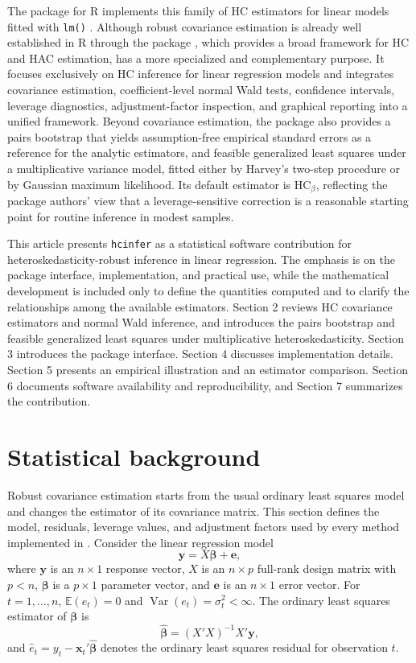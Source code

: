 The  package for R implements this family of HC estimators for linear models fitted with \texttt{lm()} \citep{RCoreTeam2026, MarinhoHcinfer2026}. Although robust covariance estimation is already well established in R through the  package \citep{Zeileis2004, Zeileis2006}, which provides a broad framework for HC and HAC estimation,  has a more specialized and complementary purpose. It focuses exclusively on HC inference for linear regression models and integrates covariance estimation, coefficient-level normal Wald tests, confidence intervals, leverage diagnostics, adjustment-factor inspection, and graphical reporting into a unified framework. Beyond covariance estimation, the package also provides a pairs bootstrap that yields assumption-free empirical standard errors as a reference for the analytic estimators, and feasible generalized least squares under a multiplicative variance model, fitted either by Harvey's two-step procedure or by Gaussian maximum likelihood. Its default estimator is \(\text{HC}_\beta\), reflecting the package authors' view that a leverage-sensitive correction is a reasonable starting point for routine inference in modest samples.

This article presents \texttt{hcinfer} as a statistical software contribution for heteroskedasticity-robust inference in linear regression. The emphasis is on the package interface, implementation, and practical use, while the mathematical development is included only to define the quantities computed and to clarify the relationships among the available estimators. Section 2 reviews HC covariance estimators and normal Wald inference, and introduces the pairs bootstrap and feasible generalized least squares under multiplicative heteroskedasticity. Section 3 introduces the package interface. Section 4 discusses implementation details. Section 5 presents an empirical illustration and an estimator comparison. Section 6 documents software availability and reproducibility, and Section 7 summarizes the contribution.

\section{Statistical background}\label{statistical-background}

Robust covariance estimation starts from the usual ordinary least squares model and changes the estimator of its covariance matrix. This section defines the model, residuals, leverage values, and adjustment factors used by every method implemented in . Consider the linear regression model
\[
\mathbf{y} = X\boldsymbol{\beta} + \mathbf{e},
\]
where \(\mathbf{y}\) is an \(n \times 1\) response vector, \(X\) is an \(n \times p\) full-rank design matrix with \(p < n\), \(\boldsymbol{\beta}\) is a \(p \times 1\) parameter vector, and \(\mathbf{e}\) is an \(n \times 1\) error vector. For \(t = 1, \ldots, n\), \(\mathbb{E}(e_t)=0\) and \(\operatorname{Var}(e_t)=\sigma_t^2 < \infty\). The ordinary least squares estimator of \(\boldsymbol{\beta}\) is
\[
\hat{\boldsymbol{\beta}} = (X'X)^{-1}X'\mathbf{y},
\]
and \(\hat{e}_t = y_t - \mathbf{x}_t'\hat{\boldsymbol{\beta}}\) denotes the ordinary least squares residual for observation \(t\).

